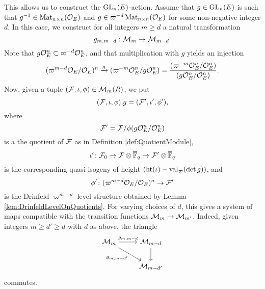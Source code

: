 \documentclass[../main.tex]{subfiles}
\begin{document}
This allows us to construct the $\operatorname{GL}_n(E)$-action. Assume that $g \in \operatorname{GL}_n(E)$ is such that $g^{-1} \in \operatorname{Mat}_{n\times
n}(\mathcal{O}_E)$ and $g \in \varpi^{-d} \operatorname{Mat}_{n \times n}(\mathcal{O}_E)$ for some non-negative
integer $d$. In this case, we construct for all integers $m \geq d$ a natural
transformation
\begin{equation*}
  g_{m, m-d}: \mathcal{M}_m \to \mathcal{M}_{m-d}.
\end{equation*}
Note that $g \mathcal{O}_E^n \subset \varpi^{-d} \mathcal{O}_E^n$, and that multiplication with
$g$ yields an injection
\begin{equation*}
  (\varpi^{m-d}\mathcal{O}_E/\mathcal{O}_E)^n \xrightarrow{g} (\varpi^{-m}\mathcal{O}_E^n/g\mathcal{O}_E^n) = 
  \frac{(\varpi^{-m} \mathcal{O}_E^n /\mathcal{O}_E^n)}{(g \mathcal{O}_E^n/\mathcal{O}_E^n)}.
\end{equation*}
Now, given a tuple $(\mathcal{F}, \iota, \phi) \in \mathcal{M}_m(R)$, we put $$(\mathcal{F}, \iota, \phi).g = (\mathcal{F}', \iota', \phi'),$$ where 
$$\mathcal{F}'= \mathcal{F}/\phi(g\mathcal{O}_E^n/\mathcal{O}_E^n)$$ 
is a the quotient of $\mathcal{F}$ as in Definition \ref{def:QuotientModule}, 
$$\iota'\colon \mathcal{F}_0 \to \mathcal{F} \otimes \overline {\mathbb{F}}_q \to \mathcal{F}' \otimes \overline {\mathbb{F}}_q$$ 
is the corresponding quasi-isogeny of height 
$(\textnormal{ht}(\iota) - \mathrm{val}_\varpi( \det g))$, and 
$$\phi'\colon (\varpi^{m-d}\mathcal{O}_E/\mathcal{O}_E)^n \to \mathcal{F}'$$ 
is the Drinfeld $\varpi^{m-d}$-level structure obtained by Lemma
\ref{lem:DrinfeldLevelOnQuotients}. 
For varying choices of $d$, this gives a system of maps compatible with the 
transition functions $\mathcal{M}_m \to \mathcal{M}_{m'}$. Indeed, given integers $m \geq d'
\geq d$ with $d$ as above, the triangle 
\begin{equation*}
\begin{tikzcd}[ampersand replacement=\&]
	{\cM_{m}} \& {\cM_{m-d}} \\
	\& {\cM_{m-d'}}
	\arrow["{g_{m,m-d}}", from=1-1, to=1-2]
	\arrow["{g_{m,m-d'}}"', from=1-1, to=2-2]
	\arrow[from=1-2, to=2-2]
\end{tikzcd}
\end{equation*}
commutes.
\end{document}
